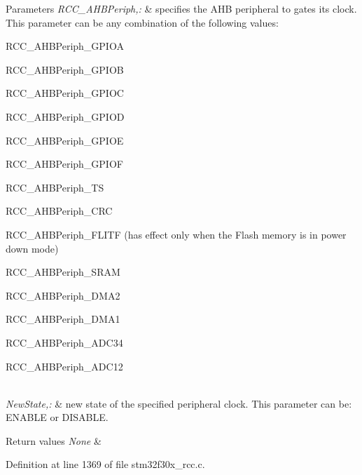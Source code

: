 \begin{DoxyParams}{Parameters}
{\em R\-C\-C\-\_\-\-A\-H\-B\-Periph,\-:} & specifies the A\-H\-B peripheral to gates its clock. This parameter can be any combination of the following values\-: \begin{DoxyItemize}
\item R\-C\-C\-\_\-\-A\-H\-B\-Periph\-\_\-\-G\-P\-I\-O\-A \item R\-C\-C\-\_\-\-A\-H\-B\-Periph\-\_\-\-G\-P\-I\-O\-B \item R\-C\-C\-\_\-\-A\-H\-B\-Periph\-\_\-\-G\-P\-I\-O\-C \item R\-C\-C\-\_\-\-A\-H\-B\-Periph\-\_\-\-G\-P\-I\-O\-D \item R\-C\-C\-\_\-\-A\-H\-B\-Periph\-\_\-\-G\-P\-I\-O\-E \item R\-C\-C\-\_\-\-A\-H\-B\-Periph\-\_\-\-G\-P\-I\-O\-F \item R\-C\-C\-\_\-\-A\-H\-B\-Periph\-\_\-\-T\-S \item R\-C\-C\-\_\-\-A\-H\-B\-Periph\-\_\-\-C\-R\-C \item R\-C\-C\-\_\-\-A\-H\-B\-Periph\-\_\-\-F\-L\-I\-T\-F (has effect only when the Flash memory is in power down mode) \item R\-C\-C\-\_\-\-A\-H\-B\-Periph\-\_\-\-S\-R\-A\-M \item R\-C\-C\-\_\-\-A\-H\-B\-Periph\-\_\-\-D\-M\-A2 \item R\-C\-C\-\_\-\-A\-H\-B\-Periph\-\_\-\-D\-M\-A1 \item R\-C\-C\-\_\-\-A\-H\-B\-Periph\-\_\-\-A\-D\-C34 \item R\-C\-C\-\_\-\-A\-H\-B\-Periph\-\_\-\-A\-D\-C12 \end{DoxyItemize}
\\
\hline
{\em New\-State,\-:} & new state of the specified peripheral clock. This parameter can be\-: E\-N\-A\-B\-L\-E or D\-I\-S\-A\-B\-L\-E. \\
\hline
\end{DoxyParams}

\begin{DoxyRetVals}{Return values}
{\em None} & \\
\hline
\end{DoxyRetVals}


Definition at line 1369 of file stm32f30x\-\_\-rcc.\-c.

